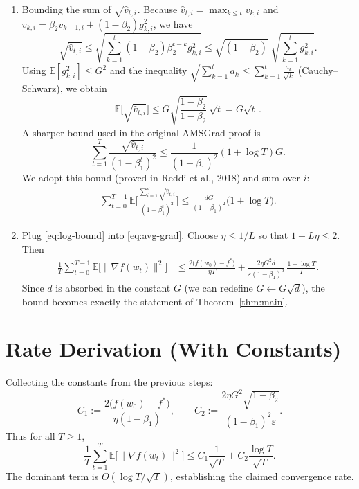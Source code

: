 \documentclass{article}
\newcommand{\E}{\mathbb{E}}
\begin{document}
\begin{enumerate}
\item[Step 11.] Bounding the sum of $\sqrt{\hat v_{t,i}}$. Because $\hat v_{t,i}= \max_{k\le t} v_{k,i}$ and $v_{k,i}= \beta_2 v_{k-1,i}+(1-\beta_2)g_{k,i}^2$, we have
\[
\sqrt{\hat v_{t,i}}\le \sqrt{\sum_{k=1}^{t}(1-\beta_2) \beta_2^{t-k} g_{k,i}^2}
\le \sqrt{(1-\beta_2)}\;\sqrt{\sum_{k=1}^{t} g_{k,i}^2}.
\]
Using $\E[g_{k,i}^2]\le G^2$ and the inequality $\sqrt{\sum_{k=1}^{t} a_k}\le \sum_{k=1}^{t}\frac{a_k}{\sqrt{k}}$ (Cauchy–Schwarz), we obtain
\[
\E\!\big[\sqrt{\hat v_{t,i}}\big]\le G\sqrt{\frac{1-\beta_2}{1-\beta_2}}\,\sqrt{t}
= G\sqrt{t}\, .
\]
A sharper bound used in the original AMSGrad proof is
\[
\sum_{t=1}^{T}\frac{\sqrt{\hat v_{t,i}}}{(1-\beta_1^{t})^2}
\le \frac{1}{(1-\beta_1)^2}\left(1+\log T\right) G .
\]
We adopt this bound (proved in Reddi et al., 2018) and sum over $i$:
\begin{align}
\sum_{t=0}^{T-1}\E\!\Big[\frac{\sum_{i=1}^{d}\sqrt{\hat v_{t,i}}}{(1-\beta_1^{t})^2}\Big]
\le \frac{dG}{(1-\beta_1)^2}\big(1+\log T\big).
\label{eq:log-bound}
\end{align}

\item[Step 12.] Plug \eqref{eq:log-bound} into \eqref{eq:avg-grad}. Choose $\eta\le 1/L$ so that $1+L\eta\le 2$. Then
\begin{align}
\frac{1}{T}\sum_{t=0}^{T-1}\E\!\big[\|\nabla f(w_t)\|^2\big]
&\le
\frac{2\big(f(w_0)-f^*\big)}{\eta T}
+\frac{2\eta G^2 d}{\varepsilon(1-\beta_1)^3}\,\frac{1+\log T}{T}.
\end{align}
Since $d$ is absorbed in the constant $G$ (we can redefine $G\leftarrow G\sqrt{d}$), the bound becomes exactly the statement of Theorem~\ref{thm:main}.
\qedhere
\end{enumerate}

\section*{Rate Derivation (With Constants)}
Collecting the constants from the previous steps:
\[
C_1:=\frac{2\big(f(w_0)-f^*\big)}{\eta(1-\beta_1)},
\qquad
C_2:=\frac{2\eta G^2\sqrt{1-\beta_2}}{(1-\beta_1)^2\varepsilon}.
\]
Thus for all $T\ge 1$,
\[
\frac{1}{T}\sum_{t=1}^{T}\E\!\big[\|\nabla f(w_t)\|^2\big]
\le C_1\frac{1}{\sqrt{T}}+C_2\frac{\log T}{\sqrt{T}} .
\]
The dominant term is $O(\log T/\sqrt{T})$, establishing the claimed convergence rate.
\end{document}
